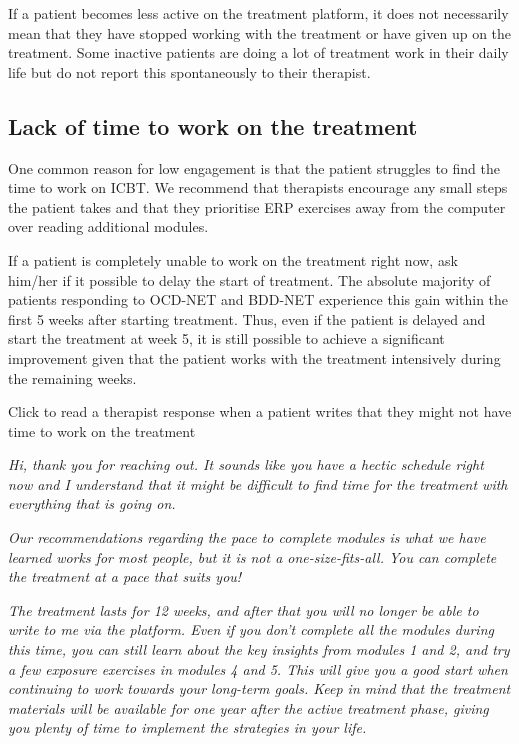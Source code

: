 \documentclass[]{book}
\theoremstyle{definition}
\theoremstyle{definition}
\theoremstyle{definition}
\theoremstyle{remark}
\begin{document}
If a patient becomes less active on the treatment platform, it does not
necessarily mean that they have stopped working with the treatment or
have given up on the treatment. Some inactive patients are doing a lot
of treatment work in their daily life but do not report this
spontaneously to their therapist.

\hypertarget{lack-of-time-to-work-on-the-treatment}{%
\subsection{Lack of time to work on the
treatment}\label{lack-of-time-to-work-on-the-treatment}}

One common reason for low engagement is that the patient struggles to
find the time to work on ICBT. We recommend that therapists encourage
any small steps the patient takes and that they prioritise ERP exercises
away from the computer over reading additional modules.

If a patient is completely unable to work on the treatment right now,
ask him/her if it possible to delay the start of treatment. The absolute
majority of patients responding to OCD-NET and BDD-NET experience this
gain within the first 5 weeks after starting treatment. Thus, even if
the patient is delayed and start the treatment at week 5, it is still
possible to achieve a significant improvement given that the patient
works with the treatment intensively during the remaining weeks.

 Click to read a therapist response when a patient writes that they
might not have time to work on the treatment

\emph{Hi, thank you for reaching out. It sounds like you have a hectic
schedule right now and I understand that it might be difficult to find
time for the treatment with everything that is going on.}

\emph{Our recommendations regarding the pace to complete modules is what
we have learned works for most people, but it is not a
one-size-fits-all. You can complete the treatment at a pace that suits
you!}

\emph{The treatment lasts for 12 weeks, and after that you will no
longer be able to write to me via the platform. Even if you don't
complete all the modules during this time, you can still learn about the
key insights from modules 1 and 2, and try a few exposure exercises in
modules 4 and 5. This will give you a good start when continuing to work
towards your long-term goals. Keep in mind that the treatment materials
will be available for one year after the active treatment phase, giving
you plenty of time to implement the strategies in your life.}
\end{document}
